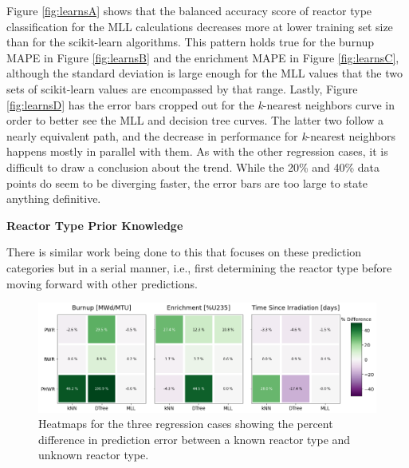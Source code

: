 Figure \ref{fig:learnsA} shows that the balanced accuracy score of reactor type
classification for the \gls{MLL} calculations decreases more at lower training
set size than for the scikit-learn algorithms.  This pattern holds true for the
burnup \gls{MAPE} in Figure \ref{fig:learnsB} and the enrichment \gls{MAPE} in
Figure \ref{fig:learnsC}, although the standard deviation is large enough for
the \gls{MLL} values that the two sets of scikit-learn values are encompassed
by that range. Lastly, Figure \ref{fig:learnsD} has the error bars cropped out
for the \textit{k}-nearest neighbors curve in order to better see the \gls{MLL}
and decision tree curves. The latter two follow a nearly equivalent path, and
the decrease in performance for \textit{k}-nearest neighbors happens mostly in
parallel with them. As with the other regression cases, it is difficult to draw
a conclusion about the trend. While the 20\% and 40\% data points do seem to be
diverging faster, the error bars are too large to state anything definitive.

\noindent \textbf{Reactor Type Prior Knowledge}

There is similar work being done  to this that focuses
on these prediction categories but in a serial manner, i.e., first determining
the reactor type before moving forward with other predictions.

\begin{figure}[!htb]
  \centering
  \includegraphics[width=1.1\textwidth]{./chapters/exp1/rxtr-type_known-unknown_diff.png}
  \caption{Heatmaps for the three regression cases showing the percent 
           difference in prediction error between a known reactor type 
           and unknown reactor type.}
  \label{fig:knownrxtr}
\end{figure}

